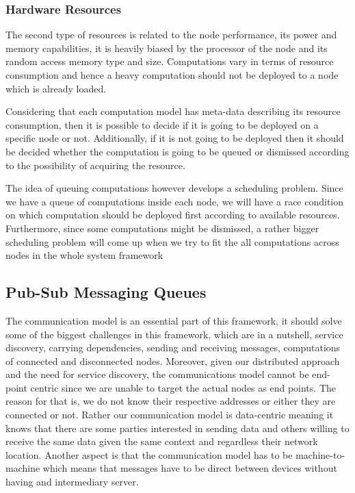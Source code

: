  

\subsubsection{Hardware Resources }

The second type of resources is related to the node performance, its power and memory capabilities, it is heavily biased by the processor of the node and its random access memory type and size. Computations vary in terms of resource consumption and hence a heavy computation should not be deployed to a node which is already loaded. 

Considering that each computation model has meta-data describing its resource consumption, then it is possible to decide if it is going to be deployed on a specific node or not. Additionally, if it is not going to be deployed then it should be decided whether the computation is going to be queued or dismissed according to the possibility of acquiring the resource.

The idea of queuing computations however develops a scheduling problem. Since we have a queue of computations inside each node, we will have a race condition on which computation should be deployed first according to available resources. Furthermore, since some computations might be dismissed, a rather bigger scheduling problem will come up when we try to fit the all computations across nodes in the whole system framework 
\newpage




\subsection{Pub-Sub Messaging Queues}

The communication model is an essential part of this framework, it should solve some of the biggest challenges in this framework, which are in a nutshell,  service discovery, carrying dependencies, sending and receiving messages, computations of connected and disconnected nodes. Moreover, given our distributed approach and the need for service discovery, the communications model cannot be  end-point centric since we are unable to target the actual nodes as end points. The reason for that is, we do not know their respective addresses or either they are connected or not. Rather our communication model is data-centric meaning it knows that there are some parties interested in sending data and others willing to receive the same data given the same context and regardless their network location. Another aspect is that the communication model has to be machine-to-machine which means that messages have to be direct between devices without having and intermediary server. \\

